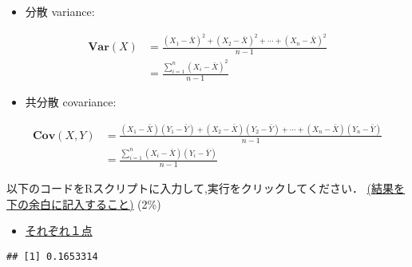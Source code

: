 \documentclass[11pt,]{problemset}
\newenvironment{Shaded}{\begin{snugshade}}{\end{snugshade}}
\newcommand{\CommentTok}[1]{\textcolor[rgb]{0.56,0.35,0.01}{\textit{#1}}}
\newcommand{\KeywordTok}[1]{\textcolor[rgb]{0.13,0.29,0.53}{\textbf{#1}}}
\newcommand{\NormalTok}[1]{#1}
\newcommand{\OperatorTok}[1]{\textcolor[rgb]{0.81,0.36,0.00}{\textbf{#1}}}
\newcommand{\StringTok}[1]{\textcolor[rgb]{0.31,0.60,0.02}{#1}}
\providecommand{\tightlist}{%
  \setlength{\itemsep}{0pt}\setlength{\parskip}{0pt}}
\begin{document}
\begin{itemize}
\tightlist
\item
  分散 variance:
\end{itemize}

\[
\begin{aligned}
\mathbf{Var}(X) & = \frac{(X_1-\bar{X})^2+(X_2-\bar{X})^2+\cdots+(X_n-\bar{X})^2}{n - 1} \\
                & = \frac{\sum_{i=1}^n(X_i-\bar{X})^2}{n -1}
\end{aligned}
\]

\begin{itemize}
\tightlist
\item
  共分散 covariance:
\end{itemize}

\[
\begin{aligned}
\mathbf{Cov}(X, Y) & = \frac{(X_1 - \bar{X})(Y_1-\bar{Y}) + (X_2 - \bar{X})(Y_2-\bar{Y}) + \cdots + (X_n - \bar{X})(Y_n-\bar{Y})}{n - 1} \\
                   & = \frac{\sum_{i = 1}^n(X_i - \bar{X})(Y_i-\bar{Y})}{n - 1}
\end{aligned}
\]

以下のコードをRスクリプトに入力して,実行をクリックしてください．\newline
\underline{(結果を下の余白に記入すること)} (2\%)

\begin{itemize}
\item
  \underline{それぞれ１点}
\end{itemize}

\begin{Shaded}
\end{Shaded}

\begin{verbatim}
## [1] 0.1653314
\end{verbatim}

\begin{Shaded}
\end{Shaded}
\end{document}
